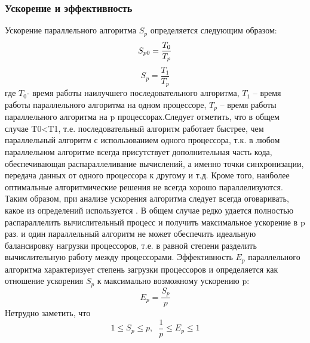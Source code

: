 \subsubsection{Ускорение и эффективность}
Ускорение параллельного алгоритма $S_{p}$ определяется следующим образом:
\begin{equation}
S_{p0}=\frac{T_{0} }{T_{p}} \\
\label{F:100}
\end{equation}
\begin{equation}
S_{p}=\frac{T_{1} }{T_{p}}
\label{F:101}
\end{equation}
где $T_{0}$- время работы наилучшего последовательного алгоритма, $T_{1}$ -- время работы параллельного алгоритма на одном процессоре, $T_{p}$ -- время работы параллельного алгоритма на p процессорах.Следует отметить, что в общем случае T0<T1, т.е. последовательный алгоритм работает быстрее, чем параллельный алгоритм с использованием одного процессора, т.к. в любом параллельном алгоритме всегда присутствует дополнительная часть кода, обеспечивающая распараллеливание вычислений, а именно точки синхронизации, передача данных от одного процессора к другому и т.д. Кроме того, наиболее оптимальные алгоритмические решения не всегда хорошо параллелизуются. Таким образом, при анализе ускорения алгоритма следует всегда оговаривать, какое из определений используется \cite{book2}. 
В общем случае редко удается полностью распараллелить вычислительный процесс и получить максимальное ускорение в p раз. и один параллельный алгоритм не может обеспечить идеальную балансировку нагрузки процессоров, т.е. в равной степени разделить вычислительную работу между процессорами. Эффективность $E_{p}$ параллельного алгоритма характеризует степень загрузки процессоров и определяется как отношение ускорения $S_{p}$ к максимально возможному ускорению p:
\begin{equation}
E_{p}=\frac{S_{p} }{p}
\label{F:102}
\end{equation}
Нетрудно заметить, что
\begin{equation}
1\leq S_{p} \leq p,\; \;  \frac{1}{p} \leq E_{p} \leq 1
\label{F:103}
\end{equation}
